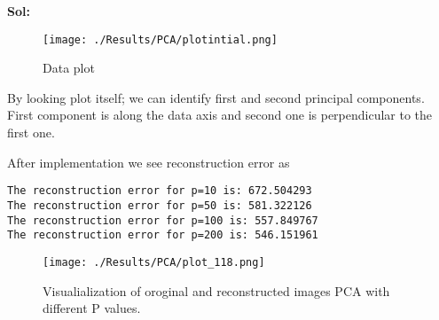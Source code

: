 \documentclass[11pt]{article}
\begin{document}
\textbf{Sol:}

\begin{figure}[h]
	\centering
	\texttt{[image: ./Results/PCA/plotintial.png]}
	\caption{Data plot}
	\label{fig:plot_initial}
\end{figure}

By looking plot itself; we can identify first and second principal components. First component is along the data axis and second one is perpendicular to the first one. 

After implementation we see reconstruction error as

\begin{verbatim}
The reconstruction error for p=10 is: 672.504293
The reconstruction error for p=50 is: 581.322126
The reconstruction error for p=100 is: 557.849767
The reconstruction error for p=200 is: 546.151961
\end{verbatim} 
\begin{figure}[h]
	\centering
	\texttt{[image: ./Results/PCA/plot\_118.png]}
	\caption{Visualialization of oroginal and reconstructed images  PCA with different P values.}
	\label{fig:plot_initial}
\end{figure}
\end{document}
